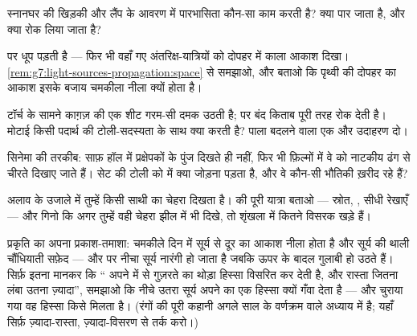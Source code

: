 \begin{exercise}[$\star$]\label{exo:g7:light-sources-propagation:7}
स्नानघर की खिड़की और लैंप के आवरण में पारभासिता कौन-सा काम करती है?
क्या पार जाता है, और क्या रोक लिया जाता है?
\end{exercise}

\begin{exercise}[$\star$]\label{exo:g7:light-sources-propagation:8}
 पर धूप पड़ती है --- फिर भी वहाँ गए अंतरिक्ष-यात्रियों को
दोपहर में काला आकाश दिखा।
\cref{rem:g7:light-sources-propagation:space} से समझाओ, और बताओ कि
पृथ्वी की दोपहर का आकाश इसके बजाय चमकीला नीला क्यों होता है।
\end{exercise}

\begin{exercise}[$\star\star$]\label{exo:g7:light-sources-propagation:9}
टॉर्च के सामने काग़ज़ की एक शीट गरम-सी दमक उठती है; पर बंद किताब
 पूरी तरह रोक देती है। मोटाई किसी पदार्थ की टोली-सदस्यता के साथ
क्या करती है? पाला बदलने वाला एक और उदाहरण दो।
\end{exercise}

\begin{exercise}[$\star\star$]\label{exo:g7:light-sources-propagation:10}
सिनेमा की तरकीब: साफ़ हॉल में प्रक्षेपकों के पुंज दिखते ही नहीं, फिर
भी फ़िल्मों में वे  को नाटकीय ढंग से चीरते दिखाए जाते हैं। सेट की
टोली को  में क्या जोड़ना पड़ता है, और वे कौन-सी भौतिकी ख़रीद रहे
हैं?
\end{exercise}

\begin{exercise}[$\star\star$]\label{exo:g7:light-sources-propagation:11}
अलाव के उजाले में तुम्हें किसी साथी का चेहरा दिखता है।  की पूरी
यात्रा बताओ --- स्रोत, , सीधी रेखाएँ --- और गिनो कि अगर तुम्हें
वही चेहरा झील में भी दिखे, तो शृंखला में कितने विसरक खड़े हैं।
\end{exercise}

\begin{exercise}[$\star\star\star$]\label{exo:g7:light-sources-propagation:12}
प्रकृति का अपना प्रकाश-तमाशा: चमकीले दिन में सूर्य से दूर का आकाश नीला
होता है और सूर्य की थाली चौंधियाती सफ़ेद --- और  पर नीचा
सूर्य नारंगी हो जाता है जबकि ऊपर के बादल गुलाबी हो उठते हैं। सिर्फ़
इतना मानकर कि `` अपने में से गुज़रते  का थोड़ा हिस्सा विसरित
कर देती है, और रास्ता जितना लंबा उतना ज़्यादा'', समझाओ कि नीचे उतरा
सूर्य अपने  का एक हिस्सा क्यों गँवा देता है --- और चुराया गया वह
हिस्सा किसे मिलता है। (रंगों की पूरी कहानी अगले साल के वर्णक्रम वाले
अध्याय में है; यहाँ सिर्फ़ ज़्यादा-रास्ता, ज़्यादा-विसरण से तर्क करो।)
\end{exercise}

